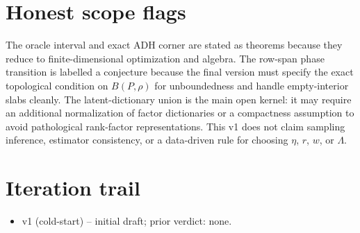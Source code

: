 \documentclass[11pt]{article}
\theoremstyle{definition}
\theoremstyle{plain}
\theoremstyle{remark}
\begin{document}
\section{Honest scope flags}
The oracle interval and exact ADH corner are stated as theorems because they reduce to finite-dimensional optimization and algebra. The row-span phase transition is labelled a conjecture because the final version must specify the exact topological condition on \(B(P,\rho)\) for unboundedness and handle empty-interior slabs cleanly. The latent-dictionary union is the main open kernel: it may require an additional normalization of factor dictionaries or a compactness assumption to avoid pathological rank-factor representations. This v1 does not claim sampling inference, estimator consistency, or a data-driven rule for choosing \(\eta\), \(r\), \(w\), or \(\Lambda\).

\section{Iteration trail}
\begin{itemize}[leftmargin=*]
\item v1 (cold-start) -- initial draft; prior verdict: none.
\end{itemize}
\end{document}
